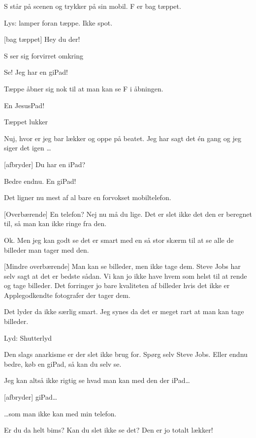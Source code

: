 \documentclass[a4paper,11pt]{article}
\begin{document}
\begin{sketch}

\scene S står på scenen og trykker på sin mobil. F er bag tæppet.

\scene Lys: lamper foran tæppe. Ikke spot.

[bag tæppet] Hey du der!

\scene S ser sig forvirret omkring

 Se! Jeg har en giPad!

\scene Tæppe åbner sig nok til at man kan se F i åbningen.

 En JesusPad! 

\scene Tæppet lukker

 Nuj, hvor er jeg bar lækker og oppe på beatet. Jeg har sagt det én gang og jeg siger det igen \ldots

[afbryder] Du har en iPad?

 Bedre endnu. En giPad! 

 Det ligner nu mest af al bare en forvokset mobiltelefon.

[Overbærende] En telefon? Nej nu må du lige. Det er slet ikke det den er beregnet til, så man kan ikke ringe fra den.

 Ok. Men jeg kan godt se det er smart med en så stor skærm til at se alle de billeder man tager med den.

[Mindre overbærende] Man kan se billeder, men ikke tage dem. Steve Jobs har selv sagt at det er bedste sådan. Vi kan jo ikke have hvem som helst til at rende og tage billeder. Det forringer jo bare kvaliteten af billeder hvis det ikke er Applegodkendte fotografer der tager dem.

 Det lyder da ikke særlig smart. Jeg synes da det er meget rart at man kan tage billeder. 

\scene Lyd: Shutterlyd

 Den slags anarkisme er der slet ikke brug for. Spørg selv Steve Jobs. Eller endnu bedre, køb en giPad, så kan du selv se.

 Jeg kan altså ikke rigtig se hvad man kan med den der iPad\ldots

[afbryder] giPad\ldots

 \ldots som man ikke kan med min telefon.

 Er du da helt bims? Kan du slet ikke se det? Den er jo totalt lækker!


\end{sketch}
\end{document}
